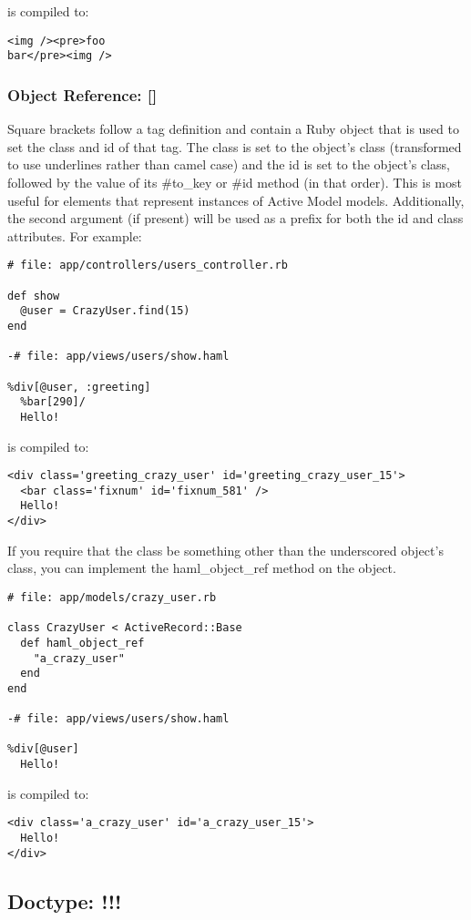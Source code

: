 \documentclass[10pt]{article}
\begin{document}
 is compiled to:
\begin{verbatim}
<img /><pre>foo
bar</pre><img />
\end{verbatim}
\subsubsection*{Object Reference: []}


 Square brackets follow a tag definition and contain a Ruby object that is used to set the class and id of that tag. The class is set to the object’s class (transformed to use underlines rather than camel case) and the id is set to the object’s class, followed by the value of its \#to\_key or \#id method (in that order). This is most useful for elements that represent instances of Active Model models. Additionally, the second argument (if present) will be used as a prefix for both the id and class attributes. For example:
\begin{verbatim}
# file: app/controllers/users_controller.rb

def show
  @user = CrazyUser.find(15)
end

-# file: app/views/users/show.haml

%div[@user, :greeting]
  %bar[290]/
  Hello!
\end{verbatim}


 is compiled to:
\begin{verbatim}
<div class='greeting_crazy_user' id='greeting_crazy_user_15'>
  <bar class='fixnum' id='fixnum_581' />
  Hello!
</div>
\end{verbatim}


 If you require that the class be something other than the underscored object’s class, you can implement the haml\_object\_ref method on the object.
\begin{verbatim}
# file: app/models/crazy_user.rb

class CrazyUser < ActiveRecord::Base
  def haml_object_ref
    "a_crazy_user"
  end
end

-# file: app/views/users/show.haml

%div[@user]
  Hello!
\end{verbatim}


 is compiled to:
\begin{verbatim}
<div class='a_crazy_user' id='a_crazy_user_15'>
  Hello!
</div>
\end{verbatim}
\subsection*{Doctype: !!!}
\end{document}
